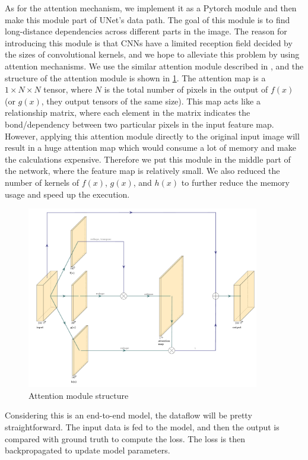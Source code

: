 \documentclass[12pt]{article}
\begin{document}
As for the attention mechanism, we implement it as a Pytorch module and then make this module
part of UNet's data path. The goal of this module is to find long-distance dependencies across different parts in the image. The reason for introducing this module is that CNNs have a limited
reception field decided by the sizes of convolutional kernels, and we hope to alleviate this problem
by using attention mechanisms. We use the similar attention module described in
\cite{zhangSelfAttentionGenerativeAdversarial2019a}, and the structure of the attention module is shown in
\ref{img:attention}. The attention map is a $1 \times N \times N$ tensor, where $N$ is the total number of
pixels in the output of $f(x)$ (or $g(x)$, they output tensors of the same size). This map acts like a
relationship matrix, where each element in the matrix indicates the bond/dependency between two particular
pixels in the input feature map. However, applying this attention module directly to the original input
image will result in a huge attention map which would consume a lot of memory and make the calculations
expensive. Therefore we put this module in the middle part of the network, where the feature map is relatively
small. We also reduced the number of kernels of $f(x)$, $g(x)$, and $h(x)$ to further reduce the memory
usage and speed up the execution.

\begin{figure}[h!]
    \centering
    \includegraphics[width=4in]{imgs/attention.pdf}
    \caption{Attention module structure}
    \label{img:attention}
\end{figure}


Considering this is an end-to-end model, the dataflow will be pretty straightforward. The input data is fed to the model,
and then the output is compared with ground truth to compute the loss. The loss is then backpropagated to update model parameters.
\end{document}
